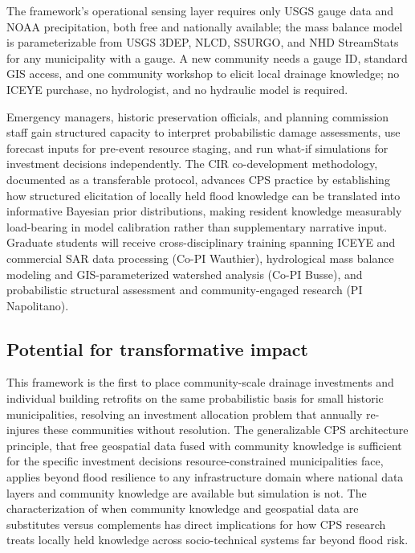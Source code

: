 \documentclass[11pt]{article}
\begin{document}
The framework's operational sensing layer requires only USGS gauge data and NOAA
precipitation, both free and nationally available;
the mass balance model is parameterizable from USGS 3DEP, NLCD, SSURGO, and NHD
StreamStats for any municipality with a gauge.
A new community needs a gauge ID, standard GIS access, and one community workshop
to elicit local drainage knowledge; no ICEYE purchase, no hydrologist, and no
hydraulic model is required.

Emergency managers, historic preservation officials, and planning commission staff
gain structured capacity to interpret probabilistic damage assessments, use forecast
inputs for pre-event resource staging, and run what-if simulations for investment
decisions independently.
The CIR co-development methodology, documented as a transferable protocol, advances
CPS practice by establishing how structured elicitation of locally held flood
knowledge can be translated into informative Bayesian prior distributions, making
resident knowledge measurably load-bearing in model calibration rather than
supplementary narrative input.
Graduate students will receive cross-disciplinary training spanning ICEYE and
commercial SAR data processing (Co-PI Wauthier), hydrological mass balance modeling
and GIS-parameterized watershed analysis (Co-PI Busse), and probabilistic structural
assessment and community-engaged research (PI Napolitano).

\vspace{-10pt}
\subsection{Potential for transformative impact}
This framework is the first to place community-scale drainage investments and
individual building retrofits on the same probabilistic basis for small historic
municipalities, resolving an investment allocation problem that annually re-injures
these communities without resolution.
The generalizable CPS architecture principle, that free geospatial data fused with
community knowledge is sufficient for the specific investment decisions
resource-constrained municipalities face, applies beyond flood resilience to any
infrastructure domain where national data layers and community knowledge are available
but simulation is not.
The characterization of when community knowledge and geospatial data are substitutes
versus complements has direct implications for how CPS research treats locally held
knowledge across socio-technical systems far beyond flood risk.
\end{document}
